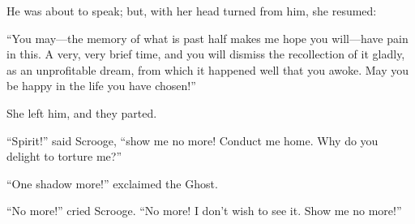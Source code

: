 \documentclass[paper=a5,BCOR=15mm,twoside,DIV=15,headinclude=off,12pt,chapterprefix=off,openany,headings=huge]{scrbook} %
\begin{document}
He was about to speak; but, with her head turned from him, she resumed:

\enquote{You may—the memory of what is past half makes me hope you will—have pain in this. A very, very brief time, and you will dismiss the recollection of it gladly, as an unprofitable dream, from which it happened well that you awoke. May you be happy in the life you have chosen!}

She left him, and they parted.

\enquote{Spirit!} said Scrooge, \enquote{show me no more! Conduct me home. Why do you delight to torture me?}

\enquote{One shadow more!} exclaimed the Ghost.

\enquote{No more!} cried Scrooge. \enquote{No more! I don't wish to see it. Show me no more!}
\end{document}
